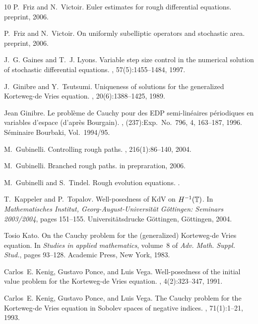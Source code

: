 \documentclass[a4paper,12pt,reqno]{article}
\begin{document}
\begin{thebibliography}{10}
P.~Friz and N.~Victoir.
\newblock Euler estimates for rough differential equations.
\newblock preprint, 2006.

P.~Friz and N.~Victoir.
\newblock On uniformly subelliptic operators and stochastic area.
\newblock preprint, 2006.

J.~G. Gaines and T.~J. Lyons.
\newblock Variable step size control in the numerical solution of stochastic
  differential equations.
, 57(5):1455--1484, 1997.

J.~Ginibre and Y.~Tsutsumi.
\newblock Uniqueness of solutions for the generalized {K}orteweg-de {V}ries
  equation.
, 20(6):1388--1425, 1989.

Jean Ginibre.
\newblock Le probl\`eme de {C}auchy pour des {EDP} semi-lin\'eaires
  p\'eriodiques en variables d'espace (d'apr\`es {B}ourgain).
, (237):Exp.\ No.\ 796, 4, 163--187, 1996.
\newblock S\'eminaire Bourbaki, Vol.\ 1994/95.

M.~Gubinelli.
\newblock Controlling rough paths.
, 216(1):86--140, 2004.

M.~Gubinelli.
\newblock Branched rough paths.
\newblock in prepraration, 2006.

M.~Gubinelli and S.~Tindel.
\newblock Rough evolution equations.
.

T.~Kappeler and P.~Topalov.
\newblock Well-posedness of {K}d{V} on {$H\sp {-1}(\mathbb{T})$}.
\newblock In {\em Mathematisches Institut, Georg-August-Universit\"at
  G\"ottingen: Seminars 2003/2004}, pages 151--155. Universit\"atsdrucke
  G\"ottingen, G\"ottingen, 2004.

Tosio Kato.
\newblock On the {C}auchy problem for the (generalized) {K}orteweg-de {V}ries
  equation.
\newblock In {\em Studies in applied mathematics}, volume~8 of {\em Adv. Math.
  Suppl. Stud.}, pages 93--128. Academic Press, New York, 1983.

Carlos~E. Kenig, Gustavo Ponce, and Luis Vega.
\newblock Well-posedness of the initial value problem for the {K}orteweg-de
  {V}ries equation.
, 4(2):323--347, 1991.

Carlos~E. Kenig, Gustavo Ponce, and Luis Vega.
\newblock The {C}auchy problem for the {K}orteweg-de {V}ries equation in
  {S}obolev spaces of negative indices.
, 71(1):1--21, 1993.


\end{thebibliography}
\end{document}
